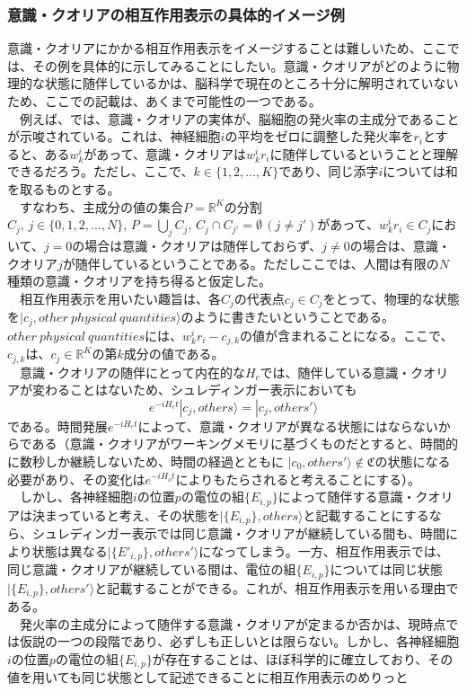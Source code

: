 \subsubsection{意識・クオリアの相互作用表示の具体的イメージ例}
意識・クオリアにかかる相互作用表示をイメージすることは難しいため、ここでは、その例を具体的に示してみることにしたい。意識・クオリアがどのように物理的な状態に随伴しているかは、脳科学で現在のところ十分に解明されていないため、ここでの記載は、あくまで可能性の一つである。\\
　例えば、\cite{Murray_2016}では、意識・クオリアの実体が、脳細胞の発火率の主成分であることが示唆されている。これは、神経細胞$i$の平均をゼロに調整した発火率を$r_i$とすると、ある$w_k^i$があって、意識・クオリアは$w_k^ir_i$に随伴しているということと理解できるだろう。ただし、ここで、$k\in\{1,2,\ldots,K\}$であり、同じ添字$i$については和を取るものとする。\\
　すなわち、主成分の値の集合$P=\mathbb{R}^K$の分割$C_j,\,j\in\{0,1,2,\ldots,N\},\, P=\bigcup_j C_j,\, C_j \cap C_{j'}=\emptyset \, (j \neq j')$があって、$w_k^ir_i \in C_j$において、$j=0$の場合は意識・クオリアは随伴しておらず、$j \neq 0$の場合は、意識・クオリア$j$が随伴しているということである。ただしここでは、人間は有限の$N$種類の意識・クオリアを持ち得ると仮定した。\\
　相互作用表示を用いたい趣旨は、各$C_j$の代表点$c_j \in C_j$をとって、物理的な状態を$|c_j,other \ physical \ quantities \rangle$のように書きたいということである。$other \ physical \  quantities$には、$w_k^ir_i - c_{j,k}$の値が含まれることになる。ここで、$c_{j,k}$は、$c_j \in \mathbb{R}^K$の第$k$成分の値である。\\
　意識・クオリアの随伴にとって内在的な$H_c$では、随伴している意識・クオリアが変わることはないため、シュレディンガー表示においても
\begin{equation}
  e^{-iH_ct}|c_j,others \rangle = |c_j,others' \rangle 
\end{equation}
である。時間発展$e^{-iH_ct}$によって、意識・クオリアが異なる状態にはならないからである（意識・クオリアがワーキングメモリに基づくものだとすると、時間的に数秒しか継続しないため、時間の経過とともに $|c_0,others' \rangle \notin \mathfrak{C}$の状態になる必要があり、その変化は$e^{-iH_ot}$によりもたらされると考えることにする）。\\
　しかし、各神経細胞$i$の位置$p$の電位の組$\{E_{i,p}\}$によって随伴する意識・クオリアは決まっていると考え、その状態を$|\{ E_{i,p}\},others \rangle$と記載することにするなら、シュレディンガー表示では同じ意識・クオリアが継続している間も、時間により状態は異なる$|\{ E'_{i,p}\},others' \rangle$になってしまう。一方、相互作用表示では、同じ意識・クオリアが継続している間は、電位の組$\{E_{i,p}\}$については同じ状態$|\{ E_{i,p}\},others' \rangle$と記載することができる。これが、相互作用表示を用いる理由である。\\
　発火率の主成分によって随伴する意識・クオリアが定まるか否かは、現時点では仮説の一つの段階であり、必ずしも正しいとは限らない。しかし、各神経細胞$i$の位置$p$の電位の組$\{E_{i,p}\}$が存在することは、ほぼ科学的に確立しており、その値を用いても同じ状態として記述できることに相互作用表示のめりっと